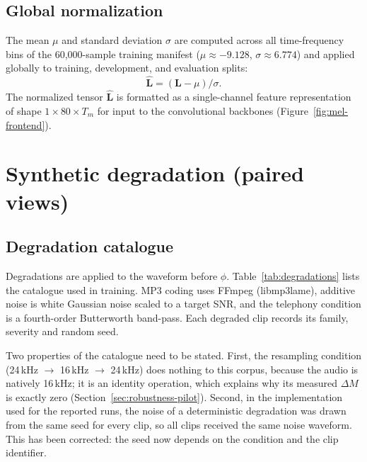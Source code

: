 \subsection{Global normalization}

The mean $\mu$ and standard deviation $\sigma$ are computed across all time-frequency bins of the 60{,}000-sample training manifest ($\mu \approx -9.128$, $\sigma \approx 6.774$) and applied globally to training, development, and evaluation splits:
\begin{equation}
\hat{\mathbf{L}} = (\mathbf{L} - \mu) / \sigma .
\label{eq:norm}
\end{equation}
The normalized tensor $\hat{\mathbf{L}}$ is formatted as a single-channel feature representation of shape $1 \times 80 \times T_m$ for input to the convolutional backbones (Figure~\ref{fig:mel-frontend}).



\section{Synthetic degradation (paired views)}
\label{sec:degradation}

\subsection{Degradation catalogue}

Degradations are applied to the waveform before $\phi$. Table~\ref{tab:degradations} lists the catalogue used in training. MP3 coding uses FFmpeg (libmp3lame), additive noise is white Gaussian noise scaled to a target SNR, and the telephony condition is a fourth-order Butterworth band-pass. Each degraded clip records its family, severity and random seed.

Two properties of the catalogue need to be stated. First, the resampling condition (24\,kHz $\rightarrow$ 16\,kHz $\rightarrow$ 24\,kHz) does nothing to this corpus, because the audio is natively 16\,kHz; it is an identity operation, which explains why its measured $\Delta M$ is exactly zero (Section~\ref{sec:robustness-pilot}). Second, in the implementation used for the reported runs, the noise of a deterministic degradation was drawn from the same seed for every clip, so all clips received the same noise waveform. This has been corrected: the seed now depends on the condition and the clip identifier.

